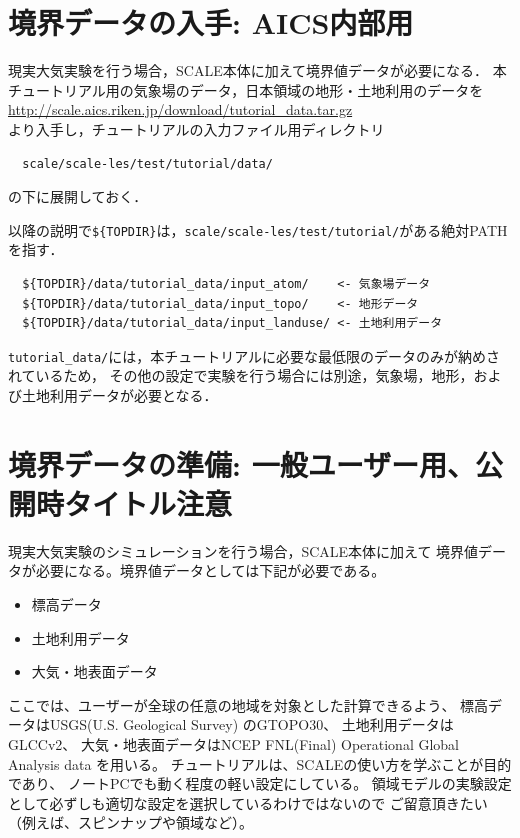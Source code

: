 \section{境界データの入手: AICS内部用}

現実大気実験を行う場合，SCALE本体に加えて境界値データが必要になる．
本チュートリアル用の気象場のデータ，日本領域の地形・土地利用のデータを\\
 \url{http://scale.aics.riken.jp/download/tutorial_data.tar.gz}\\
より入手し，チュートリアルの入力ファイル用ディレクトリ
\begin{verbatim}
  scale/scale-les/test/tutorial/data/
\end{verbatim}
の下に展開しておく．

以降の説明で\verb|${TOPDIR}|は，\verb|scale/scale-les/test/tutorial/|がある絶対PATHを指す．

\begin{verbatim}
  ${TOPDIR}/data/tutorial_data/input_atom/    <- 気象場データ
  ${TOPDIR}/data/tutorial_data/input_topo/    <- 地形データ
  ${TOPDIR}/data/tutorial_data/input_landuse/ <- 土地利用データ
\end{verbatim}
\verb|tutorial_data/|には，本チュートリアルに必要な最低限のデータのみが納めされているため，
その他の設定で実験を行う場合には別途，気象場，地形，および土地利用データが必要となる．


\section{境界データの準備: 一般ユーザー用、公開時タイトル注意}

現実大気実験のシミュレーションを行う場合，SCALE本体に加えて
境界値データが必要になる。境界値データとしては下記が必要である。
\begin{itemize}
\item 標高データ
\item 土地利用データ
\item 大気・地表面データ
\end{itemize}

ここでは、ユーザーが全球の任意の地域を対象とした計算できるよう、
標高データはUSGS(U.S. Geological Survey) のGTOPO30、
土地利用データはGLCCv2、
大気・地表面データはNCEP FNL(Final) Operational Global Analysis data
を用いる。
チュートリアルは、SCALEの使い方を学ぶことが目的であり、
ノートPCでも動く程度の軽い設定にしている。
領域モデルの実験設定として必ずしも適切な設定を選択しているわけではないので
ご留意頂きたい（例えば、スピンナップや領域など）。


